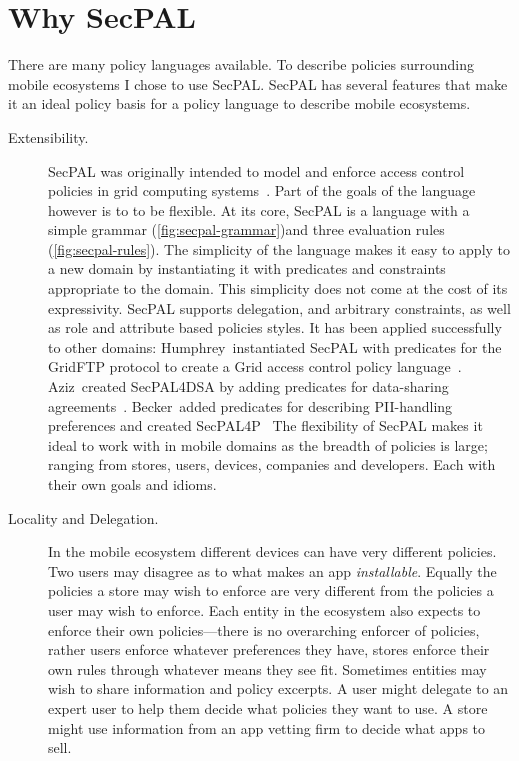 \documentclass[thesis.tex]{subfiles}
\begin{document}
\section{Why SecPAL}
\label{sec:why-apppal}

There are many policy languages available.
To describe policies surrounding mobile ecosystems I chose to use SecPAL.
SecPAL has several features that make it an ideal policy basis for a policy language to describe mobile ecosystems.

\begin{description}
  \item[Extensibility.]
    SecPAL was originally intended to model and enforce access control policies in grid computing systems~\cite{becker_secpal:_2010}.
    Part of the goals of the language however is to to be flexible.
    At its core, SecPAL is a language with a simple grammar (\autoref{fig:secpal-grammar})and three evaluation rules (\autoref{fig:secpal-rules}).
    The simplicity of the language makes it easy to apply to a new domain by instantiating it with predicates and constraints appropriate to the domain.
    This simplicity does not come at the cost of its expressivity.
    SecPAL supports delegation, and arbitrary constraints, as well as role and attribute based policies styles.
    It has been applied successfully to other domains:
    Humphrey~\etal instantiated SecPAL with predicates for the GridFTP protocol to create a Grid access control policy language~\cite{humphrey_fine-grained_2007}.
    Aziz~\etal created SecPAL4DSA by adding predicates for data-sharing agreements~\cite{aziz_secpal4dsa:_2011}.
    Becker~\etal added predicates for describing \ac{PII}-handling preferences and created SecPAL4P~\cite{becker_framework_2009}
    The flexibility of SecPAL makes it ideal to work with in mobile domains as the breadth of policies is large; ranging from stores, users, devices, companies and developers. 
    Each with their own goals and idioms.

  \item[Locality and Delegation.]
    In the mobile ecosystem different devices can have very different policies.
    Two users may disagree as to what makes an app \emph{installable}.
    Equally the policies a store may wish to enforce are very different from the policies a user may wish to enforce.
    Each entity in the ecosystem also expects to enforce their own policies---there is no overarching enforcer of policies, rather users enforce whatever preferences they have, stores enforce their own rules through whatever means they see fit.
    Sometimes entities may wish to share information and policy excerpts.
    A user might delegate to an expert user to help them decide what policies they want to use.
    A store might use information from an app vetting firm to decide what apps to sell.
    

\end{description}
\end{document}
